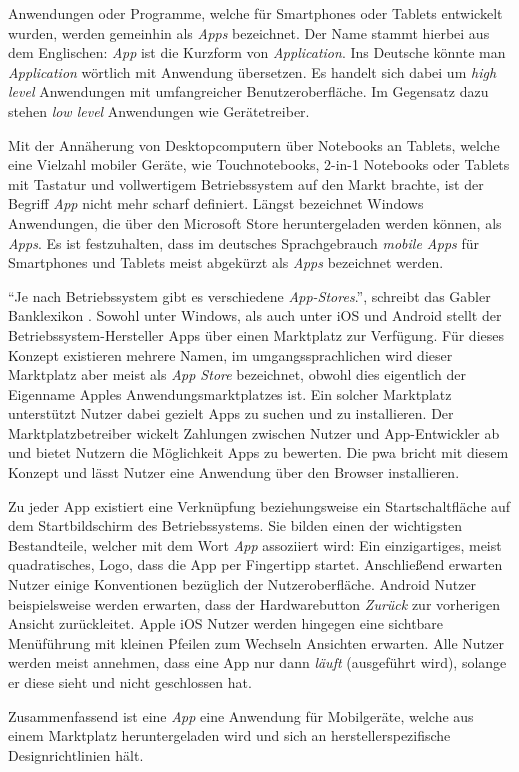 Anwendungen oder Programme, welche für Smartphones oder Tablets entwickelt wurden, werden gemeinhin als \textit{Apps} bezeichnet. Der Name stammt hierbei aus dem Englischen: \textit{App} ist die Kurzform von \textit{Application}. Ins Deutsche könnte man \textit{Application} wörtlich mit Anwendung übersetzen. \cite{BegriffApp} Es handelt sich dabei um \textit{high level} Anwendungen mit umfangreicher Benutzeroberfläche. Im Gegensatz dazu stehen \textit{low level} Anwendungen wie Gerätetreiber.

Mit der Annäherung von Desktopcomputern über Notebooks an Tablets, welche eine Vielzahl mobiler Geräte, wie Touchnotebooks, 2-in-1 Notebooks oder Tablets mit Tastatur und vollwertigem Betriebssystem auf den Markt brachte, ist der Begriff \textit{App} nicht mehr scharf definiert.
Längst bezeichnet Windows Anwendungen, die über den Microsoft Store heruntergeladen werden können, als \textit{Apps}. Es ist festzuhalten, dass im deutsches Sprachgebrauch \textit{mobile Apps} für Smartphones und Tablets meist abgekürzt als \textit{Apps} bezeichnet werden.



``Je nach Betriebssystem gibt es verschiedene \textit{App-Stores}.'', schreibt das Gabler Banklexikon \cite{BegriffAppGabler}. Sowohl unter Windows, als auch unter iOS und Android stellt der Betriebssystem-Hersteller Apps über einen Marktplatz zur Verfügung. Für dieses Konzept existieren mehrere Namen, im umgangssprachlichen wird dieser Marktplatz aber meist als \textit{App Store} bezeichnet, obwohl dies eigentlich der Eigenname Apples Anwendungsmarktplatzes ist. 
Ein solcher Marktplatz unterstützt Nutzer dabei gezielt Apps zu suchen und zu installieren. Der Marktplatzbetreiber wickelt Zahlungen zwischen Nutzer und App-Entwickler ab und bietet Nutzern die Möglichkeit Apps zu bewerten. 
Die \acf{pwa} bricht mit diesem Konzept und lässt Nutzer eine Anwendung über den Browser installieren. 

Zu jeder App existiert eine Verknüpfung beziehungsweise ein Startschaltfläche auf dem Startbildschirm des Betriebssystems. Sie bilden einen der wichtigsten Bestandteile, welcher mit dem Wort \textit{App} assoziiert wird: Ein einzigartiges, meist quadratisches, Logo, dass die App per Fingertipp startet. Anschließend erwarten Nutzer einige Konventionen bezüglich der Nutzeroberfläche. Android Nutzer beispielsweise werden erwarten, dass der Hardwarebutton \textit{Zurück} zur vorherigen Ansicht zurückleitet. Apple iOS Nutzer werden hingegen eine sichtbare Menüführung mit kleinen Pfeilen zum Wechseln Ansichten erwarten. Alle Nutzer werden meist annehmen, dass eine App nur dann \textit{läuft} (ausgeführt wird), solange er diese sieht und nicht geschlossen hat.

Zusammenfassend ist eine \textit{App} eine Anwendung für Mobilgeräte, welche aus einem Marktplatz heruntergeladen wird und sich an herstellerspezifische Designrichtlinien hält.